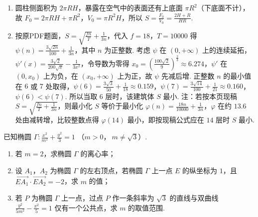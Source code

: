 \begin{solution}
\begin{enumerate}
\item 圆柱侧面积为 \(2\pi RH\)，暴露在空气中的表面还有上底面 \(\pi R^2\)（下底面不计），故 \(F_0=2\pi RH+\pi R^2\)，\(V_0=\pi R^2H\)，所以 \(S=\frac{F_0}{V_0}=\frac{2H+R}{HR}\).
\item 按原PDF题面，\(S=\sqrt{\frac{fn}{T}}+\frac{1}{3n}\)，代入 \(f=18\)，\(T=10000\) 得 \(\psi\left(n\right)=\frac{3\sqrt{2n}}{100}+\frac{1}{3n}\)，其中 \(n\) 为正整数. 考虑 \(\psi\) 在 \(\left(0,+\infty\right)\) 上的连续延拓，\(\psi'\left(x\right)=\frac{3\sqrt2}{200\sqrt x}-\frac{1}{3x^2}\)，令导数为零得 \(x_0=\left(\frac{100\sqrt2}{9}\right)^{\frac{2}{3}}\approx6.274\)，\(\psi'\) 在 \(\left(0,x_0\right)\) 上为负，在 \(\left(x_0,+\infty\right)\) 上为正，故 \(\psi\) 先减后增. 正整数 \(n\) 的最小值在 \(6\) 或 \(7\) 处取得，\(\psi\left(6\right)=\frac{3\sqrt3}{50}+\frac{1}{18}\approx0.159\)，\(\psi\left(7\right)=\frac{3\sqrt{14}}{100}+\frac{1}{21}\approx0.160\)，\(\psi\left(6\right)<\psi\left(7\right)\). 所以当取 \(6\) 层时，该建筑体 \(S\) 最小. 注：若按本页现稿 \(S=\sqrt{\frac{fn}{T}+\frac{1}{3n}}\)，则最小化 \(S\) 等价于最小化 \(\varphi\left(n\right)=\frac{18n}{10000}+\frac{1}{3n}\)，\(\varphi\) 在约 \(13.6\) 处由减转增，比较整数点得 \(\varphi\left(14\right)\) 最小，即按现稿公式应在 \(14\) 层时 \(S\) 最小.
\end{enumerate}
\end{solution}

\begin{problem}
已知椭圆 \(\Gamma:\frac{x^2}{m^2}+\frac{y^2}{3}=1\) （\(m>0\)，\(\ m\neq \sqrt3\)）.

\begin{enumerate}
\item 若 \(m=2\)，求椭圆 \(\Gamma\) 的离心率；
\item 设 \(A_1\)，\(A_2\) 为椭圆 \(\Gamma\) 的左右顶点，若椭圆 \(\Gamma\) 上一点 \(E\) 的纵坐标为 \(1\)，且 \(\overrightarrow{EA_1}\cdot\overrightarrow{EA_2}=-2\)，求 \(m\) 的值；
\item 若 \(P\) 为椭圆 \(\Gamma\) 上一点，过点 \(P\) 作一条斜率为 \(\sqrt3\) 的直线与双曲线 \(\frac{y^2}{5m^2}-\frac{x^2}{5}=1\) 仅有一个公共点，求 \(m\) 的取值范围.
\end{enumerate}
\end{problem}

